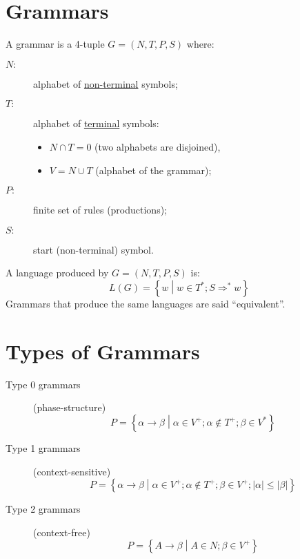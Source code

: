 \section{Grammars}
A grammar is a 4-tuple $G = (N, T, P, S)$ where:
\begin{description}
	\item[$N:$] alphabet of \underline{non-terminal} symbols;
	\item[$T:$] alphabet of \underline{terminal} symbols:
	\begin{itemize}
		\item $N \cap T = 0$ (two alphabets are disjoined),
		\item $V = N \cup T$ (alphabet of the grammar);
	\end{itemize}
	\item[$P:$] finite set of rules (productions);
	\item[$S:$] start (non-terminal) symbol.
\end{description}

A language produced by $G = (N, T, P, S)$ is:
$$
	L(G) = \left\{w \middle| w \in T^\ast; S \Rightarrow^\ast w\right\}
$$
Grammars that produce the same languages are said ``equivalent''.

\section{Types of Grammars}
\begin{description}
	\item[Type 0 grammars] (phase-structure)
		$$
			P = \left\{\alpha \to \beta \middle| \alpha \in V^+; \alpha \notin T^+; \beta \in V^\ast \right\}
		$$
	\item[Type 1 grammars] (context-sensitive)
		$$
			P = \left\{\alpha \to \beta \middle| \alpha \in V^+; \alpha \notin T^+; \beta \in V^+; |\alpha| \leq |\beta| \right\}
		$$
	\item[Type 2 grammars] (context-free)
		$$
			P = \left\{A \to \beta \middle| A \in N; \beta \in V^+ \right\}
		$$
\end{description}

